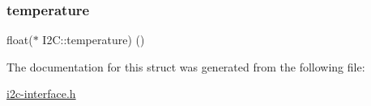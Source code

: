 \subsubsection{\texorpdfstring{temperature}{temperature}}
{\footnotesize\ttfamily float($\ast$  I2\+C\+::temperature) ()}



The documentation for this struct was generated from the following file\+:\begin{DoxyCompactItemize}
\item 
\hyperlink{i2c-interface_8h}{i2c-\/interface.\+h}\end{DoxyCompactItemize}
